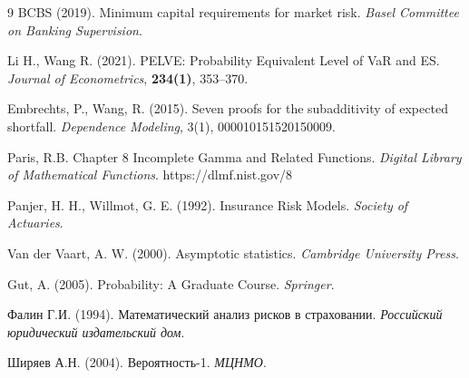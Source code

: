 \documentclass[12pt]{article}
\theoremstyle{plain}
\theoremstyle{definition}
\theoremstyle{remark}
\begin{document}
\begin{thebibliography}{9}
     BCBS (2019). Minimum capital requirements for market risk. \textit{Basel Committee on Banking Supervision}.
    
    Li H., Wang R. (2021). PELVE: Probability Equivalent Level of VaR and ES. \textit{Journal of Econometrics}, \textbf{234(1)}, 353–370.

    Embrechts, P., Wang, R. (2015). Seven proofs for the subadditivity of expected shortfall. \textit{Dependence Modeling}, 3(1), 000010151520150009.

    Paris, R.B. Chapter 8 Incomplete Gamma and Related Functions. \textit{Digital Library of Mathematical Functions}. https://dlmf.nist.gov/8 
    
    Panjer, H. H., Willmot, G. E. (1992). Insurance Risk Models. \textit{Society of Actuaries}.

    Van der Vaart, A. W. (2000). Asymptotic statistics. \textit{Cambridge University Press}.
    
    Gut, A. (2005). Probability: A Graduate Course. \textit{Springer}.

    Фалин Г.И. (1994). Математический анализ рисков в страховании. \textit{Российский юридический издательский дом}.

    Ширяев А.Н. (2004). Вероятность-1. \textit{МЦНМО}.


\end{thebibliography}
\end{document}
